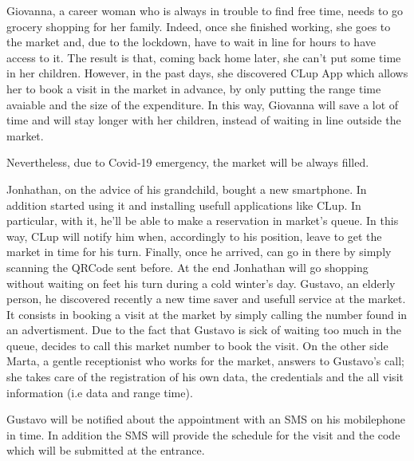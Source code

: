  

 
Giovanna, a career woman who is always in trouble to find free time, needs to go grocery shopping for her family. 
Indeed, once she finished working, she goes to the market and, due to the lockdown, have to wait in line for hours to have access to it. The result is that, coming back home later, she can't put some time in her children.
However, in the past days, she discovered CLup App which allows her to book a visit in the market in advance, by only putting the range time avaiable and the size of the expenditure.
In this way, Giovanna will save a lot of time and will stay longer with her children, instead of waiting in line outside the market.

Nevertheless, due to Covid-19 emergency, the market will be always filled.

Jonhathan, on the advice of his grandchild, bought a new smartphone.  In addition started using it and installing usefull applications like CLup.
In particular, with it, he'll be able to make a reservation in market's queue. In this way, CLup will notify him when, accordingly to his position, leave to get the market in time for his turn.
Finally, once he arrived, can go in there by simply scanning the QRCode sent before. 
At the end Jonhathan will go shopping without waiting on feet his turn during a cold winter's day.
Gustavo, an elderly person, he discovered recently a new time saver and usefull service at the market. It consists in booking a visit at the market by simply calling the number found in an advertisment. 
Due to the fact that Gustavo is sick of waiting too much in the queue, decides to call this market number to book the visit.
On the other side Marta, a gentle receptionist who works for the market, answers to Gustavo's call; she takes care of the registration of his own data, the credentials and the all visit information (i.e data and range time).

Gustavo will be notified about the appointment with an SMS on his mobilephone in time. In addition the SMS will provide the schedule for the visit and the code which will be submitted at the entrance.

